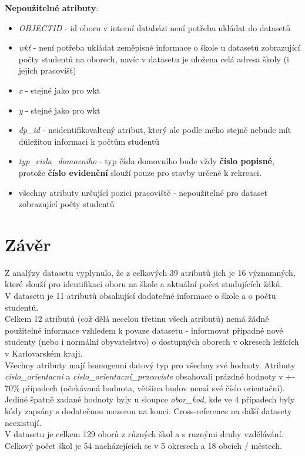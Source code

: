 \documentclass[12pt, a4paper]{article}
\begin{document}
\noindent \textbf{Nepoužitelné atributy}:
\begin{itemize}
\item \textit{OBJECTID} - id oboru v interní databázi není potřeba ukládat do datasetů
\item \textit{wkt} - není potřeba ukládat zeměpisné informace o škole u datasetů zobrazující počty studentů na oborech, navíc v datasetu je uložena celá adresa školy (i jejich pracovišť)
\item \textit{x} - stejné jako pro wkt
\item \textit{y} - stejné jako pro wkt
\item \textit{dp\_id} - neidentifikovaltený atribut, který ale podle mého stejně nebude mít důležitou informaci k počtům studentů
\item \textit{typ\_cisla\_domovniho} - typ čísla domovního bude vždy \textbf{číslo popisné}, protože \textbf{číslo evidenční} slouží pouze pro stavby určené k rekreaci.
\item všechny atributy určující pozici pracoviště - nepoužitelné pro dataset zobrazující počty studentů
\end{itemize}

\newpage

\section{Závěr}
Z analýzy datasetu vyplynulo, že z celkových 39 atributů jich je 16 významných, které slouží pro identifikaci oboru na škole a aktuální počet studujících žáků. \\
\indent V datasetu je 11 atributů obsahující dodatečné informace o škole a o počtu studentů.\\
\indent Celkem 12 atributů (což dělá necelou třetinu všech atributů) nemá žádné použitelné informace vzhledem k povaze datasetu - informovat případné nové studenty (nebo i normální obyvatelstvo) o dostupných oborech v okresech ležících v Karlovarském kraji.\\

\indent Všechny atributy mají homogenní datový typ pro všechny své hodnoty. Atributy \textit{cislo\_orientacni} a \textit{cislo\_orientacni\_pracoviste} obsahovali prázdné hodnoty v +- 70\% případech (očekávaná hodnota, většina budov nemá své číslo orientační). Jediné špatně zadané hodnoty byly u sloupce \textit{obor\_kod}, kde ve 4 případech byly kódy zapsány s dodatečnou mezerou na konci. Cross-reference na další datasety neexistují. \\

\indent V datasetu je celkem 129 oborů z různých škol a s ruznými druhy vzdělávání. Celkový počet škol je 54 nacházejících se v 5 okresech a 18 obcích / městech. \\


	
\end{document}
